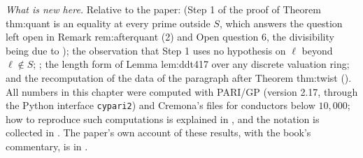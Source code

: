 \emph{What is new here.} Relative to the paper:  (Step 1 of the proof of Theorem thm:quant is an equality at every prime outside $S$, which answers the question
left open in Remark rem:afterquant (2) and Open question 6, the divisibility being due to ); the observation that Step 1 uses no hypothesis on $\ell$ beyond $\ell\notin S$;
; the length form of Lemma lem:ddt417 over any discrete valuation ring; and the recomputation of the data of the paragraph after Theorem thm:twist
(). All numbers in this chapter were computed with PARI/GP \cite{PARI} (version 2.17, through the Python interface \texttt{cypari2}) and Cremona's files
\cite{ecdata} for conductors below $10{,}000$; how to reproduce such computations is explained in , and the notation is collected in . The paper's own
account of these results, with the book's commentary, is in .
